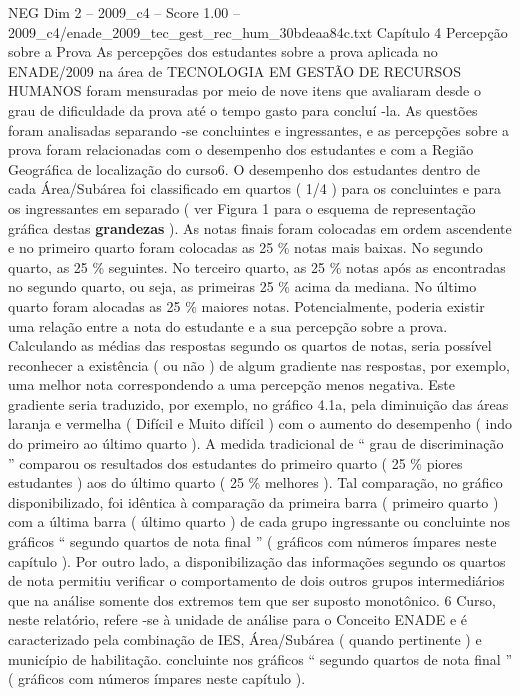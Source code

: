 \begin{textsample}{NEG Dim 2 – 2009\_c4 – Score 1.00 – 2009\_c4/enade\_2009\_tec\_gest\_rec\_hum\_30bdeaa84c.txt}  \label{ex:f2_neg_233}
Capítulo 4 Percepção sobre a Prova As percepções dos estudantes sobre a prova aplicada no ENADE/2009 na área de TECNOLOGIA EM GESTÃO DE RECURSOS HUMANOS foram mensuradas por meio de nove itens que avaliaram desde o grau de dificuldade da prova até o tempo gasto para concluí -la.
As questões foram analisadas separando -se concluintes e ingressantes, e as percepções sobre a prova foram relacionadas com o desempenho dos estudantes e com a Região Geográfica de localização do curso6.
O desempenho dos estudantes dentro de cada Área/Subárea foi classificado em quartos ( 1/4 ) para os concluintes e para os ingressantes em separado ( ver Figura 1 para o esquema de representação gráfica destas \textbf{grandezas} ).
As notas finais foram colocadas em ordem ascendente e no primeiro quarto foram colocadas as 25 \% notas mais baixas.
No segundo quarto, as 25 \% seguintes.
No terceiro quarto, as 25 \% notas após as encontradas no segundo quarto, ou seja, as primeiras 25 \% acima da mediana.
No último quarto foram alocadas as 25 \% maiores notas.
Potencialmente, poderia existir uma relação entre a nota do estudante e a sua percepção sobre a prova.
Calculando as médias das respostas segundo os quartos de notas, seria possível reconhecer a existência ( ou não ) de algum gradiente nas respostas, por exemplo, uma melhor nota correspondendo a uma percepção menos negativa.
Este gradiente seria traduzido, por exemplo, no gráfico 4.1a, pela diminuição das áreas laranja e vermelha ( Difícil e Muito difícil ) com o aumento do desempenho ( indo do primeiro ao último quarto ).
A medida tradicional de “ grau de discriminação ” comparou os resultados dos estudantes do primeiro quarto ( 25 \% piores estudantes ) aos do último quarto ( 25 \% melhores ).
Tal comparação, no gráfico disponibilizado, foi idêntica à comparação da primeira barra ( primeiro quarto ) com a última barra ( último quarto ) de cada grupo ingressante ou concluinte nos gráficos “ segundo quartos de nota final ” ( gráficos com números ímpares neste capítulo ).
Por outro lado, a disponibilização das informações segundo os quartos de nota permitiu verificar o comportamento de dois outros grupos intermediários que na análise somente dos extremos tem que ser suposto monotônico. 6 Curso, neste relatório, refere -se à unidade de análise para o Conceito ENADE e é caracterizado pela combinação de IES, Área/Subárea ( quando pertinente ) e município de habilitação. concluinte nos gráficos “ segundo quartos de nota final ” ( gráficos com números ímpares neste capítulo ).

\end{textsample}
